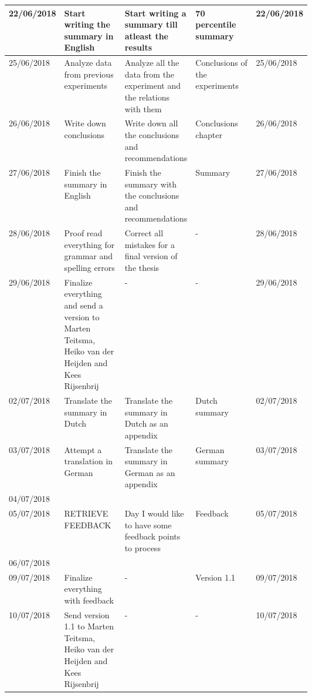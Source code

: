 \begin{longtable}{| l | p{0.2\linewidth}| p{0.2\linewidth} | p{0.2\linewidth} | l |}
22/06/2018 & Start writing the summary in English & Start writing a summary till atleast the results & 70 percentile summary & 22/06/2018 \\
\hline

25/06/2018 & Analyze data from previous experiments & Analyze all the data from the experiment and the relations with them & Conclusions of the experiments & 25/06/2018 \\
\hline

26/06/2018 & Write down conclusions & Write down all the conclusions and recommendations & Conclusions chapter & 26/06/2018 \\
\hline

27/06/2018 & Finish the summary in English & Finish the summary with the conclusions and recommendations & Summary & 27/06/2018 \\
\hline

28/06/2018 & Proof read everything for grammar and spelling errors & Correct all mistakes for a final version of the thesis & - & 28/06/2018 \\
\hline

29/06/2018 & Finalize everything and send a version to Marten Teitsma, Heiko van der Heijden and Kees Rijsenbrij & - & - & 29/06/2018 \\
\hline

02/07/2018 & Translate the summary in Dutch & Translate the summary in Dutch as an appendix & Dutch summary & 02/07/2018 \\
\hline

03/07/2018 & Attempt a translation in German & Translate the summary in German as an appendix & German summary & 03/07/2018 \\
\hline

04/07/2018 & &&& \\
\hline

05/07/2018 & RETRIEVE FEEDBACK & Day I would like to have some feedback points to process & Feedback &  05/07/2018 \\
\hline

06/07/2018 & &&& \\
\hline

09/07/2018 & Finalize everything with feedback & - & Version 1.1 & 09/07/2018 \\
\hline

10/07/2018 & Send version 1.1 to Marten Teitsma, Heiko van der Heijden and Kees Rijsenbrij & - & - & 10/07/2018\\
\hline

\end{longtable} 
%